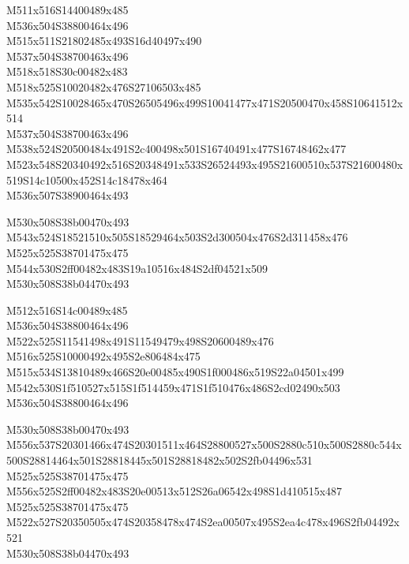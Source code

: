 \documentclass{article}
\begin{document}
\begin{multicols}{5}
\begin{center}
M511x516S14400489x485 %
\\M536x504S38800464x496 %
\\M515x511S21802485x493S16d40497x490 %
\\M537x504S38700463x496 %
\\M518x518S30c00482x483 %
\\M518x525S10020482x476S27106503x485 %
\\M535x542S10028465x470S26505496x499S10041477x471S20500470x458S10641512x514 %
\\M537x504S38700463x496 %
\\M538x524S20500484x491S2c400498x501S16740491x477S16748462x477 %
\\M523x548S20340492x516S20348491x533S26524493x495S21600510x537S21600480x519S14c10500x452S14c18478x464 %
\\M536x507S38900464x493 %

M530x508S38b00470x493 %
\\M543x524S18521510x505S18529464x503S2d300504x476S2d311458x476 %
\\M525x525S38701475x475 %
\\M544x530S2ff00482x483S19a10516x484S2df04521x509 %
\\M530x508S38b04470x493 %
\vfil
\columnbreak

M512x516S14c00489x485 %
\\M536x504S38800464x496 %
\\M522x525S11541498x491S11549479x498S20600489x476 %
\\M516x525S10000492x495S2e806484x475 %
\\M515x534S13810489x466S20e00485x490S1f000486x519S22a04501x499 %
\\M542x530S1f510527x515S1f514459x471S1f510476x486S2cd02490x503 %
\\M536x504S38800464x496 %

M530x508S38b00470x493 %
\\M556x537S20301466x474S20301511x464S28800527x500S2880c510x500S2880c544x500S28814464x501S28818445x501S28818482x502S2fb04496x531 %
\\M525x525S38701475x475 %
\\M556x525S2ff00482x483S20e00513x512S26a06542x498S1d410515x487 %
\\M525x525S38701475x475 %
\\M522x527S20350505x474S20358478x474S2ea00507x495S2ea4c478x496S2fb04492x521 %
\\M530x508S38b04470x493 %
\vfil

\end{center}
\end{multicols}
\end{document}
